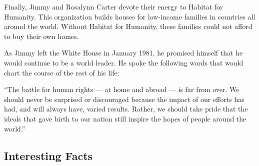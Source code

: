 \documentclass{article}
\begin{document}
Finally, Jimmy and Rosalynn Carter devote their energy to Habitat for Humanity. This organization builds houses for low-income families in countries all around the world. Without Habitat for Humanity, these families could not afford to buy their own homes.

As Jimmy left the White House in January 1981, he promised himself that he would continue to be a world leader. He spoke the following words that would chart the course of the rest of his life:

``The battle for human rights --- at home and abroad --- is far from over. We should never be surprised or discouraged because the impact of our efforts has had, and will always have, varied results. Rather, we should take pride that the ideals that gave birth to our nation still inspire the hopes of people around the world.''


\subsection*{Interesting Facts}
\end{document}
